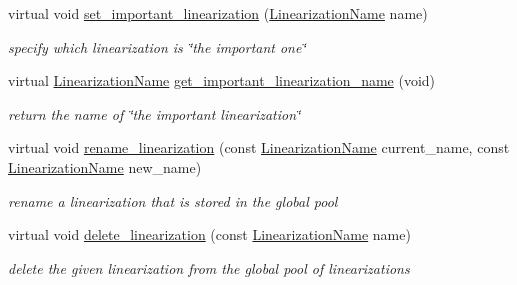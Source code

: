\begin{Indent}
\begin{DoxyCompactItemize}
virtual void \mbox{\hyperlink{class_s_m_spp__di__unipi__it_1_1_c05_function_a8f18fc84fa93ad03235186bda78238e4}{set\+\_\+important\+\_\+linearization}} (\mbox{\hyperlink{class_s_m_spp__di__unipi__it_1_1_c05_function_ae90bf93c6d4b4ada66791c735d1c03cc}{Linearization\+Name}} name)
\begin{DoxyCompactList}\small\item\em specify which linearization is \char`\"{}the important one\char`\"{} \end{DoxyCompactList}\item 
virtual \mbox{\hyperlink{class_s_m_spp__di__unipi__it_1_1_c05_function_ae90bf93c6d4b4ada66791c735d1c03cc}{Linearization\+Name}} \mbox{\hyperlink{class_s_m_spp__di__unipi__it_1_1_c05_function_abb9e7e2895542986ff7748e38d0dd2e5}{get\+\_\+important\+\_\+linearization\+\_\+name}} (void)
\begin{DoxyCompactList}\small\item\em return the name of \char`\"{}the important linearization\char`\"{} \end{DoxyCompactList}\item 
virtual void \mbox{\hyperlink{class_s_m_spp__di__unipi__it_1_1_c05_function_acfc994eb90b924695d059aeddef6dc00}{rename\+\_\+linearization}} (const \mbox{\hyperlink{class_s_m_spp__di__unipi__it_1_1_c05_function_ae90bf93c6d4b4ada66791c735d1c03cc}{Linearization\+Name}} current\+\_\+name, const \mbox{\hyperlink{class_s_m_spp__di__unipi__it_1_1_c05_function_ae90bf93c6d4b4ada66791c735d1c03cc}{Linearization\+Name}} new\+\_\+name)
\begin{DoxyCompactList}\small\item\em rename a linearization that is stored in the global pool \end{DoxyCompactList}\item 
virtual void \mbox{\hyperlink{class_s_m_spp__di__unipi__it_1_1_c05_function_a538bfc1740cb18a36b0edf8b35085e2c}{delete\+\_\+linearization}} (const \mbox{\hyperlink{class_s_m_spp__di__unipi__it_1_1_c05_function_ae90bf93c6d4b4ada66791c735d1c03cc}{Linearization\+Name}} name)
\begin{DoxyCompactList}\small\item\em delete the given linearization from the global pool of linearizations \end{DoxyCompactList}\item 

\end{DoxyCompactItemize}
\end{Indent}
